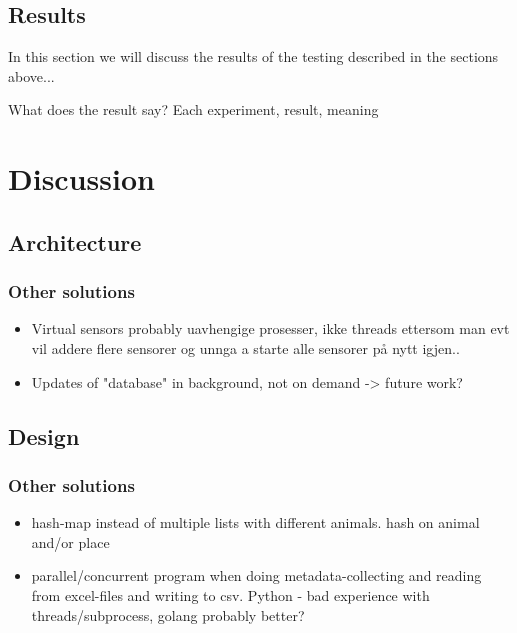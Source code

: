 \documentclass[USenglish]{uit-thesis}
\begin{document}
\section{Results}
In this section we will discuss the results of the testing described in the sections above...

What does the result say?
Each experiment, result, meaning


\chapter{Discussion}

\section{Architecture}
\subsection{Other solutions}
\begin{itemize}
\item Virtual sensors probably uavhengige prosesser, ikke threads ettersom man evt vil addere flere sensorer og unnga a starte alle sensorer på nytt igjen..
\item Updates of "database" in background, not on demand -> future work?
\end{itemize}

\section{Design}
\subsection{Other solutions}
\begin{itemize}
\item hash-map instead of multiple lists with different animals. hash on animal and/or place
\item parallel/concurrent program when doing metadata-collecting and reading from excel-files and writing to csv. Python - bad experience with threads/subprocess, golang probably better?
\end{itemize}
\end{document}
